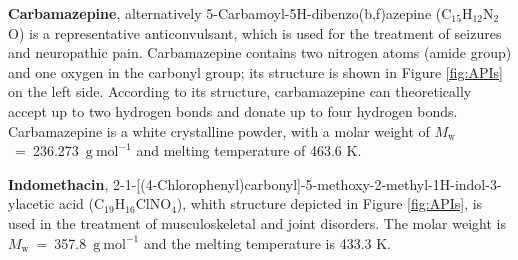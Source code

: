 \textbf{Carbamazepine}, alternatively 5-Carbamoyl-5H-dibenzo(b,f)azepine (C$_{15}$H$_{12}$N$_{2}$O) is a representative anticonvulsant, which is used for the treatment of seizures and neuropathic pain. Carbamazepine contains two nitrogen atoms (amide group) and one oxygen in the carbonyl group; its structure is shown in Figure \ref{fig:APIs} on the left side. According to its structure, carbamazepine can theoretically accept up to two hydrogen bonds and donate up to four hydrogen bonds. Carbamazepine is a white crystalline powder, with a molar weight of $M_\mathrm{w}$~=~236.273~$\mathrm{g\ mol^{-1}}$ and melting temperature of 463.6 K. \cite{stejfa_heat_2021}

\textbf{Indomethacin}, 2-{1-[(4-Chlorophenyl)carbonyl]-5-methoxy-2-methyl-1H-indol-3-yl}acetic acid (C$_{19}$H$_{16}$ClNO$_{4}$), whith structure depicted in Figure \ref{fig:APIs}, is used in the treatment of musculoskeletal and joint disorders. The molar weight is $M_\mathrm{w}$~=~357.8~$\mathrm{g\ mol^{-1}}$ and the melting temperature is 433.3 K. \cite{stejfa_heat_2021}

